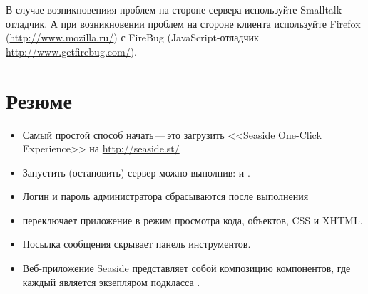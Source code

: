 \documentclass[a4paper,10pt,twoside]{book}
\begin{document}
В случае возникновениия проблем на стороне сервера используйте
Smalltalk-отладчик. А при возникновении проблем на стороне клиента
используйте Firefox (\url{http://www.mozilla.ru/}) с FireBug (JavaScript-отладчик
\url{http://www.getfirebug.com/}). 


\section{Резюме}

\begin{itemize}
\item Самый простой способ начать\,---\,это загрузить <<Seaside One-Click
Experience>> на \url{http://seaside.st/} 
\item Запустить (остановить) сервер можно выполнив:
 и .
\item Логин и пароль администратора сбрасываются после выполнения 
\item {} переключает приложение в режим просмотра
кода, объектов, CSS и XHTML.
\item Посылка сообщения 
скрывает панель инструментов.
\item Веб-приложение Seaside представляет собой композицию компонентов,
где каждый является экзепляром подкласса .

\end{itemize}
\end{document}

